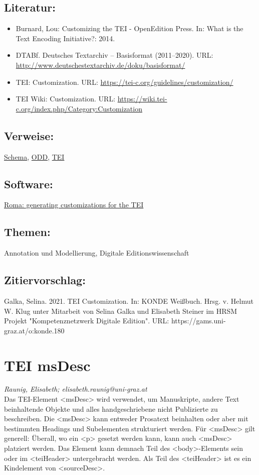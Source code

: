 \documentclass{article}
\begin{document}
        \subsection*{Literatur:}\begin{itemize}\item Burnard, Lou: Customizing the TEI - OpenEdition Press. In: What is the Text Encoding Initiative?: 2014.\item DTABf. Deutsches Textarchiv – Basisformat (2011–2020). URL: \url{http://www.deutschestextarchiv.de/doku/basisformat/}\item TEI: Customization. URL: \url{https://tei-c.org/guidelines/customization/}\item TEI Wiki: Customization. URL: \url{https://wiki.tei-c.org/index.php/Category:Customization}\end{itemize}\subsection*{Verweise:}\href{https://gams.uni-graz.at/o:konde.166}{Schema}, \href{https://gams.uni-graz.at/o:konde.150}{ODD}, \href{https://gams.uni-graz.at/o:konde.178}{TEI}\subsection*{Software:}\href{https://roma.tei-c.org}{Roma: generating customizations for the TEI}\subsection*{Themen:}Annotation und Modellierung, Digitale Editionswissenschaft\subsection*{Zitiervorschlag:}Galka, Selina. 2021. TEI Customization. In: KONDE Weißbuch. Hrsg. v. Helmut W. Klug unter Mitarbeit von Selina Galka und Elisabeth Steiner im HRSM Projekt "Kompetenznetzwerk Digitale Edition". URL: https://gams.uni-graz.at/o:konde.180\newpage\section*{TEI msDesc} \emph{Raunig, Elisabeth; elisabeth.raunig@uni-graz.at }\\
        
    Das TEI-Element <msDesc> wird verwendet, um Manuskripte, andere
                  Text beinhaltende Objekte und alles handgeschriebene nicht Publizierte zu
                  beschreiben. Die <msDesc> kann entweder Prosatext beinhalten
                  oder aber mit bestimmten Headings und Subelementen strukturiert werden. Für
                     <msDesc> gilt generell: Überall, wo ein
                     <p> gesetzt werden kann, kann auch
                     <msDesc> platziert werden. Das Element kann demnach Teil des
                     <body>-Elements sein oder im <teiHeader>
                  untergebracht werden. Als Teil des <teiHeader> ist es ein
                  Kindelement von <sourceDesc>.\\
            
\end{document}

